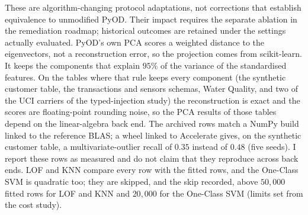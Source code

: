 \documentclass[conference]{IEEEtran}
\begin{document}
These are algorithm-changing protocol adaptations, not corrections that
establish equivalence to unmodified PyOD. Their impact requires the
separate ablation in the remediation roadmap; historical outcomes are
retained under the settings actually evaluated.
PyOD's own PCA
scores a weighted distance to the eigenvectors, not a reconstruction
error, so the projection comes from scikit-learn. It keeps the components that explain
$95\%$ of the variance of the standardised features. On the tables where that rule keeps
every component (the synthetic customer table, the transactions and sensors schemas, Water
Quality, and two of the UCI carriers of the typed-injection study) the reconstruction is
exact and the scores are floating-point rounding noise, so the PCA results of those tables
depend on the linear-algebra back end. The archived rows match a NumPy build linked to the
reference BLAS; a wheel linked to Accelerate gives, on the synthetic customer table, a
multivariate-outlier recall of $0.35$ instead of $0.48$ (five seeds). I report these rows as
measured and do not claim that they reproduce across back ends. LOF and KNN compare every
row with the fitted rows, and the One-Class SVM is quadratic too; they are
skipped, and the skip recorded, above $50{,}000$ fitted rows for LOF and KNN and
$20{,}000$ for the One-Class SVM (limits set from the cost study).
\end{document}
